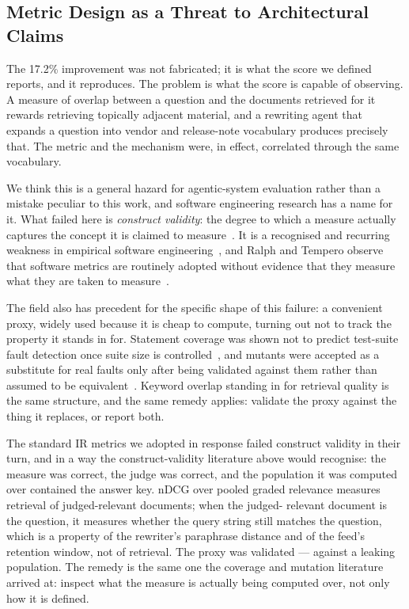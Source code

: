 \documentclass[acmsmall,review,anonymous,screen]{acmart}
\begin{document}
\subsection{Metric Design as a Threat to Architectural Claims}
\label{sec:metric-threat}

The 17.2\% improvement was not fabricated; it is what the score we defined
reports, and it reproduces. The problem is what the score is capable of
observing. A measure of overlap between a question and the documents retrieved
for it rewards retrieving topically adjacent material, and a rewriting agent
that expands a question into vendor and release-note vocabulary produces
precisely that. The metric and the mechanism were, in effect, correlated
through the same vocabulary.

We think this is a general hazard for agentic-system evaluation rather than a
mistake peculiar to this work, and software engineering research has a name for
it. What failed here is \emph{construct validity}: the degree to which a measure
actually captures the concept it is claimed to measure~\cite{wohlin2012experimentation,
kitchenham2002guidelines}. It is a recognised and recurring weakness in empirical
software engineering~\cite{sjoberg2007future,siegmund2015validity,verdecchia2023threats,lago2024threats},
and Ralph and Tempero observe that software metrics are routinely adopted without
evidence that they measure what they are taken to measure~\cite{ralph2018construct}.

The field also has precedent for the specific shape of this failure: a
convenient proxy, widely used because it is cheap to compute, turning out not to
track the property it stands in for. Statement coverage was shown not to predict
test-suite fault detection once suite size is controlled~\cite{inozemtseva2014coverage},
and mutants were accepted as a substitute for real faults only after being
validated against them rather than assumed to be
equivalent~\cite{just2014mutants,papadakis2018mutation}. Keyword overlap standing in
for retrieval quality is the same structure, and the same remedy applies:
validate the proxy against the thing it replaces, or report both.

The standard IR metrics we adopted in response failed construct validity in
their turn, and in a way the construct-validity literature above would
recognise: the measure was correct, the judge was correct, and the population
it was computed over contained the answer key. nDCG over pooled graded
relevance measures retrieval of judged-relevant documents; when the judged-
relevant document is the question, it measures whether the query string still
matches the question, which is a property of the rewriter's paraphrase
distance and of the feed's retention window, not of retrieval. The proxy was
validated --- against a leaking population. The remedy is the same one the
coverage and mutation literature arrived at: inspect what the measure is
actually being computed over, not only how it is defined.
\end{document}
